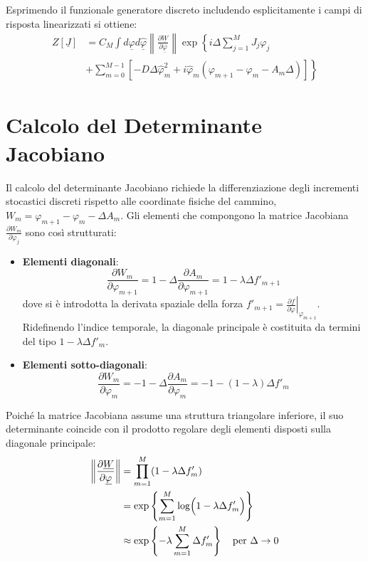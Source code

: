 Esprimendo il funzionale generatore discreto includendo esplicitamente i campi di risposta linearizzati si ottiene:
\begin{align}
Z[\underline{J}] &= C_M \int d\underline{\varphi} d\underline{\hat{\varphi}} \left\| \frac{\partial \underline{W}}{\partial \underline{\varphi}} \right\| \exp\left\{ i\Delta \sum_{j=1}^{M} J_j \varphi_j \right. \nonumber \\ 
&\left. + \sum_{m=0}^{M-1} \left[ -D\Delta\hat{\varphi}_m^2 + i\hat{\varphi}_m(\varphi_{m+1}-\varphi_m-A_m\Delta) \right] \right\}
\label{eq:funzionale_discreto_completo}
\end{align}

\section{Calcolo del Determinante Jacobiano}
Il calcolo del determinante Jacobiano richiede la differenziazione degli incrementi stocastici discreti rispetto alle coordinate fisiche del cammino, $W_m = \varphi_{m+1}-\varphi_m - \Delta A_m$. Gli elementi che compongono la matrice Jacobiana $\frac{\partial W_m}{\partial \varphi_j}$ sono così strutturati:
\begin{itemize}
    \item \textbf{Elementi diagonali}:
    \begin{equation}
    \frac{\partial W_m}{\partial \varphi_{m+1}} = 1 - \Delta \frac{\partial A_m}{\partial \varphi_{m+1}} = 1 - \lambda\Delta f'_{m+1}
    \end{equation}
    dove si è introdotta la derivata spaziale della forza $f'_{m+1} = \left. \frac{\partial f}{\partial\varphi} \right|_{\varphi_{m+1}}$. Ridefinendo l'indice temporale, la diagonale principale è costituita da termini del tipo $1 - \lambda\Delta f'_{m}$.
    \item \textbf{Elementi sotto-diagonali}:
    \begin{equation}
    \frac{\partial W_m}{\partial \varphi_m} = -1 - \Delta \frac{\partial A_m}{\partial \varphi_m} = -1 - (1-\lambda)\Delta f'_m
    \end{equation}
\end{itemize}

Poiché la matrice Jacobiana assume una struttura triangolare inferiore, il suo determinante coincide con il prodotto regolare degli elementi disposti sulla diagonale principale:
\begin{align}
\left\| \frac{\partial \underline{W}}{\partial \underline{\varphi}} \right\| &= \prod_{m=1}^{M} (1-\lambda\Delta f'_m) \nonumber \\ 
&= \exp\left \{\sum_{m=1}^{M} \log \Bigl( 1-\lambda\Delta f'_m\Bigr) \right\} \nonumber \\ 
&\approx \exp\left\{ -\lambda \sum_{m=1}^{M} \Delta f'_m \right\} \quad \text{per } \Delta \to 0
\label{eq:determinante_jacobiano_esponenziale}
\end{align}

